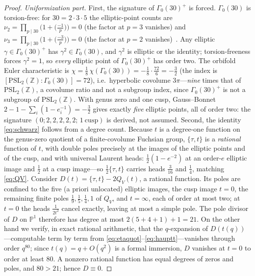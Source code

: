 \documentclass[11pt]{article}
\theoremstyle{plain}
\theoremstyle{remark}
\begin{document}
\begin{proof}
\emph{Uniformization part.} First, the signature of $\Gamma_0(30)^+$ is forced. $\Gamma_0(30)$ is
torsion-free: for $30=2\cdot3\cdot5$ the elliptic-point counts are
$\nu_2=\prod_{p\mid30}\big(1+\big(\tfrac{-1}{p}\big)\big)=0$ (the factor at $p=3$ vanishes) and
$\nu_3=\prod_{p\mid30}\big(1+\big(\tfrac{-3}{p}\big)\big)=0$ (the factor at $p=2$
vanishes)~\cite{DiamondShurman}. Any elliptic $\gamma\in\Gamma_0(30)^+$ has $\gamma^2\in\Gamma_0(30)$, and
$\gamma^2$ is elliptic or the identity; torsion-freeness forces $\gamma^2=1$, so \emph{every} elliptic point
of $\Gamma_0(30)^+$ has order two. The orbifold Euler characteristic is
$\chi=\tfrac18\,\chi(\Gamma_0(30))=-\tfrac18\cdot\tfrac{72}{6}=-\tfrac32$ (the index is
$[\mathrm{PSL}_2(\mathbb{Z}):\Gamma_0(30)]=72$), i.e.\ hyperbolic covolume $3\pi$---\emph{nine} times that of
$\mathrm{PSL}_2(\mathbb{Z})$, a covolume ratio and not a subgroup index, since $\Gamma_0(30)^+$ is not a
subgroup of $\mathrm{PSL}_2(\mathbb{Z})$. With genus zero and one cusp, Gauss--Bonnet
$2-1-\sum_i(1-e_i^{-1})=-\tfrac32$ gives exactly \emph{five} elliptic points, all of order two: the signature
$(0;2,2,2,2,2;\,1\ \mathrm{cusp})$ is derived, not assumed. Second, the identity \eqref{eq:schwarz} follows
from a degree count. Because $t$ is a degree-one function on the genus-zero quotient of a finite-covolume
Fuchsian group, $\{\tau,t\}$ is a
\emph{rational} function of $t$, with double poles precisely at the images of the elliptic points and of the
cusp, and with universal Laurent heads: $\tfrac12(1-e^{-2})$ at an order-$e$ elliptic image and $\tfrac12$ at
a cusp image---so $\tfrac12\{\tau,t\}$ carries heads $\tfrac3{16}$ and $\tfrac14$, matching \eqref{eq:QV}.
Consider $D(t)=\{\tau,t\}-2Q_V(t)$, a rational function. Its poles are confined to the five (a priori
unlocated) elliptic images, the cusp image $t=0$, the remaining finite poles $\tfrac19,\tfrac15,\tfrac14,1$ of
$Q_V$, and $t=\infty$, each of order at most two; at $t=0$ the heads $\tfrac1{2t^2}$ cancel exactly, leaving
at most a simple pole. The pole divisor of $D$ on $\mathbb{P}^1$ therefore has degree at most
$2(5+4+1)+1=21$. On the other hand we verify, in exact rational arithmetic, that the $q$-expansion of
$D(t(q))$---computable term by term from \eqref{eq:etaquot}--\eqref{eq:hauptt}---vanishes through order
$q^{80}$; since $t(q)=q+O(q^2)$ is a formal immersion, $D$ vanishes at $t=0$ to order at least $80$. A nonzero
rational function has equal degrees of zeros and poles, and $80>21$; hence $D\equiv0$.
\end{proof}
\end{document}
